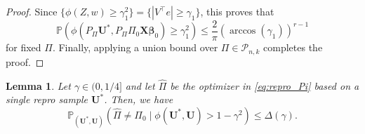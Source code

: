 \documentclass[11pt, reqno]{amsart}
\newcommand{\bP}{\mathbb{P}}
\renewcommand{\le}{\leqslant}
\renewcommand{\ge}{\geqslant}
\newcommand{\mP}{\mathcal{P}}
\newcommand{\1}{\mbox{1}\hspace{-0.25em}\mbox{l}}
\theoremstyle{definition}\newtheorem{problem}{Problem}[section]
\theoremstyle{definition}\newtheorem{definition}[problem]{Definition}
\theoremstyle{remark}\newtheorem{assumption}{Assumption}
\theoremstyle{remark}\newtheorem{remark}[problem]{Remark}
\theoremstyle{definition}\newtheorem{example}[problem]{Example}
\theoremstyle{plain}\newtheorem{theorem}[problem]{Theorem}
\theoremstyle{plain}\newtheorem{question}[problem]{Question}
\theoremstyle{plain}\newtheorem{lemma}[problem]{Lemma}
\theoremstyle{plain}\newtheorem{proposition}[problem]{Proposition}
\theoremstyle{plain}\newtheorem{corollary}[problem]{Corollary}
\theoremstyle{plain}\newtheorem{conjecture}[problem]{Conjecture}
\begin{document}
\begin{proof}
Since $\{\phi(Z,w)\ge \gamma_1^2\}=\{|V^\top e|\ge \gamma_1\}$, this proves that
\[
\bP\left(\phi\left(P_\Pi\bm U^*,P_\Pi\Pi_0\bm X\bm\beta_0\right)\ge \gamma_1^2\right)
\le \frac{2}{\pi}\left(\arccos(\gamma_1)\right)^{r-1}
\]
for fixed $\Pi$.
Finally, applying a union bound over $\Pi\in\mP_{n,k}$ completes the proof.
\end{proof}



\begin{lemma}\label{lem:inconsistency}
Let $\gamma\in(0,1/4]$ and let $\widehat{\Pi}$ be the optimizer in \eqref{eq:repro_Pi} based on a single repro sample $\bm U^*$. Then, we have
\[
\bP_{(\bm U^*,\bm U)}\left(
\widehat{\Pi}\neq \Pi_0 \mid \phi(\bm U^*,\bm U)>1-\gamma^2
\right)
\le \Delta(\gamma).
\]
\end{lemma}
\end{document}
